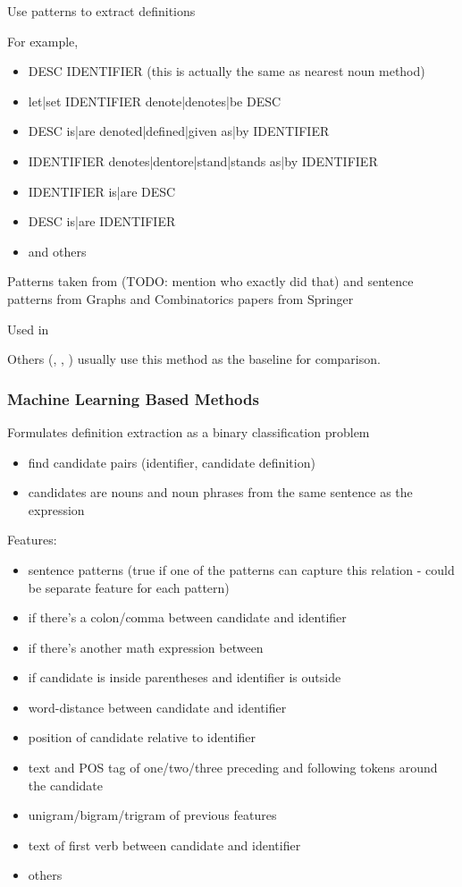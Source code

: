Use patterns to extract definitions

For example,

\begin{itemize}
  \item DESC IDENTIFIER (this is actually the same as nearest noun method)
  \item let|set IDENTIFIER denote|denotes|be DESC
  \item DESC is|are denoted|defined|given as|by IDENTIFIER
  \item IDENTIFIER denotes|dentore|stand|stands as|by IDENTIFIER
  \item IDENTIFIER is|are DESC
  \item DESC is|are IDENTIFIER
  \item and others
\end{itemize}


Patterns taken from
\cite{trzeciak1995writing} (TODO: mention who exactly did that)
and sentence patterns from Graphs and Combinatorics papers from Springer

Used in \cite{quoc2010mining}

Others (\cite{kristianto2012extracting}, \cite{kristianto2014extracting}, \cite{pagael2014mlp})
usually use this method as the baseline for comparison.


\subsubsection{Machine Learning Based Methods}
Formulates definition extraction as a binary classification problem

\begin{itemize}
  \item find candidate pairs (identifier, candidate definition)
  \item candidates are nouns and noun phrases from the same sentence as the expression
\end{itemize}


Features:
\begin{itemize}
  \item sentence patterns (true if one of the patterns can capture this relation - could be separate feature for each pattern)
  \item if there's a colon/comma between candidate and identifier
  \item if there's another math expression between
  \item if candidate is inside parentheses and identifier is outside
  \item word-distance between candidate and identifier
  \item position of candidate relative to identifier
  \item text and POS tag of one/two/three preceding and following tokens around the candidate
  \item unigram/bigram/trigram of previous features
  \item text of first verb between candidate and identifier
  \item others
\end{itemize}

